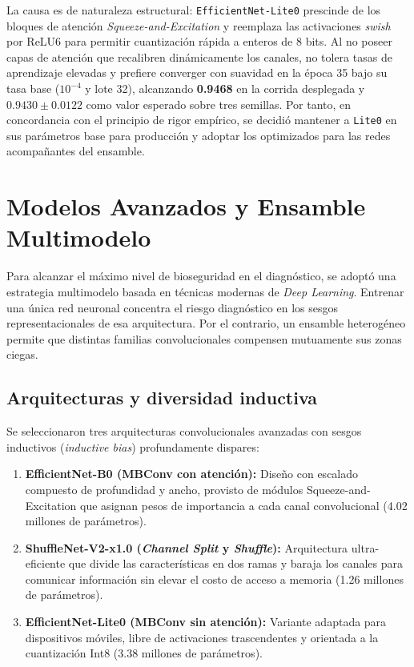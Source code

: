 \documentclass[12pt,letterpaper]{article}
\begin{document}
La causa es de naturaleza estructural: \texttt{EfficientNet-Lite0} prescinde de los bloques de atenci\'on \textit{Squeeze-and-Excitation} y reemplaza las activaciones \textit{swish} por ReLU6 para permitir cuantizaci\'on r\'apida a enteros de 8 bits. Al no poseer capas de atenci\'on que recalibren din\'amicamente los canales, no tolera tasas de aprendizaje elevadas y prefiere converger con suavidad en la \'epoca 35 bajo su tasa base ($10^{-4}$ y lote 32), alcanzando \textbf{0.9468} en la corrida desplegada y $0.9430 \pm 0.0122$ como valor esperado sobre tres semillas. Por tanto, en concordancia con el principio de rigor emp\'irico, se decidi\'o mantener a \texttt{Lite0} en sus par\'ametros base para producci\'on y adoptar los optimizados para las redes acompa\~nantes del ensamble.

\newpage

\section{Modelos Avanzados y Ensamble Multimodelo}

Para alcanzar el m\'aximo nivel de bioseguridad en el diagn\'ostico, se adopt\'o una estrategia multimodelo basada en t\'ecnicas modernas de \textit{Deep Learning}. Entrenar una \'unica red neuronal concentra el riesgo diagn\'ostico en los sesgos representacionales de esa arquitectura. Por el contrario, un ensamble heterog\'eneo permite que distintas familias convolucionales compensen mutuamente sus zonas ciegas.

\subsection{Arquitecturas y diversidad inductiva}

Se seleccionaron tres arquitecturas convolucionales avanzadas con sesgos inductivos (\textit{inductive bias}) profundamente dispares:
\begin{enumerate}
\item \textbf{EfficientNet-B0 (MBConv con atenci\'on):} Dise\~no con escalado compuesto de profundidad y ancho, provisto de m\'odulos Squeeze-and-Excitation que asignan pesos de importancia a cada canal convolucional (4.02 millones de par\'ametros).
\item \textbf{ShuffleNet-V2-x1.0 (\textit{Channel Split} y \textit{Shuffle}):} Arquitectura ultra-eficiente que divide las caracter\'isticas en dos ramas y baraja los canales para comunicar informaci\'on sin elevar el costo de acceso a memoria (1.26 millones de par\'ametros).
\item \textbf{EfficientNet-Lite0 (MBConv sin atenci\'on):} Variante adaptada para dispositivos m\'oviles, libre de activaciones trascendentes y orientada a la cuantizaci\'on Int8 (3.38 millones de par\'ametros).
\end{enumerate}
\end{document}
